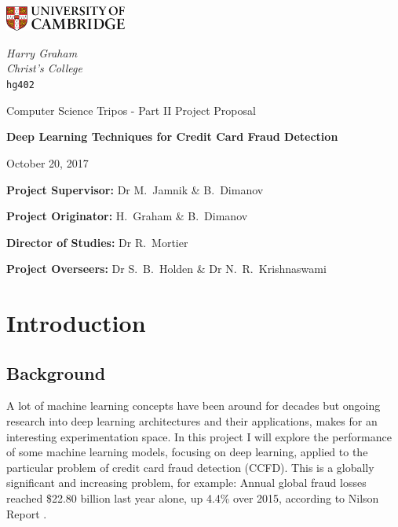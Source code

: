 \documentclass[12pt,a4paper,twoside]{article}
\begin{document}
\begin{titlepage}
	\noindent
	\begin{minipage}[t][][t]{0.5\textwidth}
		\includegraphics[width=40mm]{CamLogo.jpg}
	\end{minipage}
	\begin{minipage}{0.5\textwidth}
	\begin{flushright}
		\large
		\textit{Harry Graham}
		\\
		\textit{Christ's College}
		\\
		\texttt{hg402}
	\end{flushright}
	\end{minipage}
	
	\begin{center}
	\vspace{6cm}
	{\sc\large Computer Science Tripos - Part II Project Proposal\par}
	\vspace{0.5cm}
	{\huge\bf Deep Learning Techniques for Credit Card Fraud Detection\par}
	\vspace{0.5cm}
	{\large October 20, 2017 \par}
	\end{center}
	
	\vfill
	
	\begin{flushleft}
		\textbf{Project Supervisor:} Dr M.~Jamnik \& B.~Dimanov
		
		\textbf{Project Originator:}  H.~Graham \& B.~Dimanov

		\textbf{Director of Studies:}  Dr R.~Mortier

		\textbf{Project Overseers:} Dr S.~B.~Holden  \& Dr N.~R.~Krishnaswami
	\end{flushleft}
	
	\vspace{1.5cm}
\end{titlepage}

\section*{Introduction}
 \subsection*{Background}
 A lot of machine learning concepts have been around for decades but ongoing research into deep learning architectures and their applications, makes for an interesting experimentation space. In this project I will explore the performance of some machine learning models, focusing on deep learning, applied to the particular problem of credit card fraud detection (CCFD). This is a globally significant and increasing problem, for example: Annual global fraud losses reached \$22.80 billion last year alone, up 4.4\% over 2015, according to Nilson Report \cite{nilsonreport}. 
 
\end{document}
